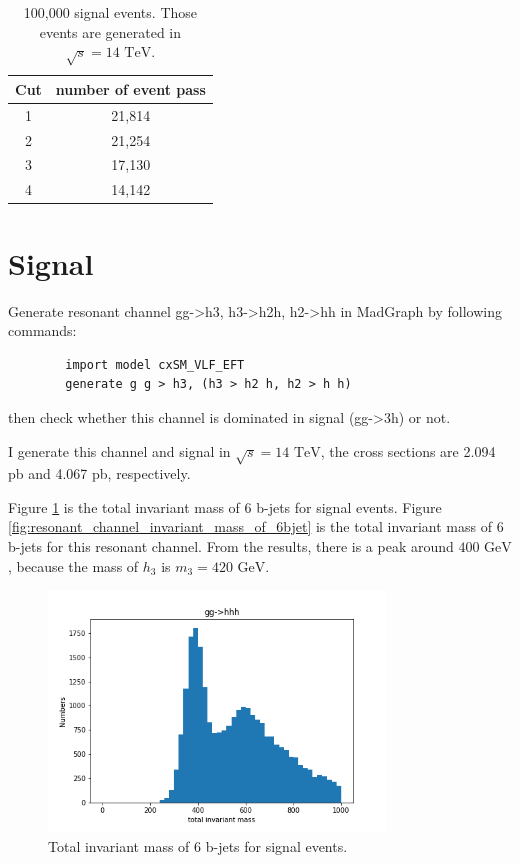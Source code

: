 \documentclass[12pt]{article}
\begin{document}
	\begin{table}[htpb]
		\centering
		\caption{100,000 signal events. Those events are generated in $\sqrt{s} = 14 \text{ TeV}$.}
		\label{tab:cutflow_table_signal_bjet}
		\begin{tabular}{cc}
			Cut & number of event pass \\
			\hline
			1 & 21,814 \\
			2 & 21,254 \\
			3 & 17,130 \\
			4 & 14,142 
		\end{tabular}	
	\end{table}

\section{Signal}%
\label{sec:signal}
	Generate resonant channel gg->h3, h3->h2h, h2->hh in MadGraph by following commands:
	\begin{verbatim}
		import model cxSM_VLF_EFT
		generate g g > h3, (h3 > h2 h, h2 > h h)
	\end{verbatim}
	then check whether this channel is dominated in signal (gg->3h) or not.

	I generate this channel and signal in $\sqrt{s} = \text{14 TeV}$, the cross sections are 2.094 pb and 4.067 pb, respectively.

	Figure \ref{fig:signal_invariant_mass_of_6bjet} is the total invariant mass of 6 b-jets for signal events. Figure \ref{fig:resonant_channel_invariant_mass_of_6bjet} is the total invariant mass of 6 b-jets for this resonant channel. From the results, there is a peak around $\text{400 GeV}$, because the mass of $h_3$ is $m_3 = \text{420 GeV}$.

	\begin{figure}[htpb]
		\centering
		\includegraphics[width=0.8\textwidth]{signal_6_b-jets_total_invariant_mass.png}
		\caption{Total invariant mass of 6 b-jets for signal events.}
		\label{fig:signal_invariant_mass_of_6bjet}
	\end{figure}
\end{document}
